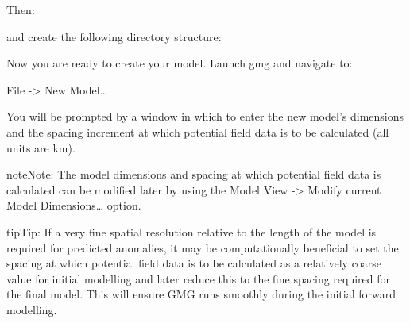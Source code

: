 \documentclass[a4paper,12pt,english]{sphinxmanual}
\begin{document}
%
\begin{sphinxVerbatim}[commandchars=\\\{\}]
 
\end{sphinxVerbatim}

Then:

%
\begin{sphinxVerbatim}[commandchars=\\\{\}]
 
\end{sphinxVerbatim}

and create the following directory structure:

%
\begin{sphinxVerbatim}[commandchars=\\\{\}]
         
\end{sphinxVerbatim}

Now you are ready to create your model. Launch gmg and navigate to:

File -\textgreater{} New Model…

You will be prompted by a window in which to enter the new model’s dimensions and the spacing
increment at which potential field data is to be calculated (all units are km).

\begin{sphinxadmonition}{note}{Note:}
The model dimensions and spacing at which potential field data is calculated can be modified later by using the
Model View -\textgreater{} Modify current Model Dimensions… option.
\end{sphinxadmonition}

\begin{sphinxadmonition}{tip}{Tip:}
If a very fine spatial resolution relative to the length of the model is required for predicted anomalies, it may
be computationally beneficial to set the  spacing at which potential field data is to be calculated as a relatively
coarse value for initial modelling and later reduce this to the fine spacing required for the final model. This will
ensure GMG runs smoothly during the initial forward modelling.
\end{sphinxadmonition}
\end{document}
